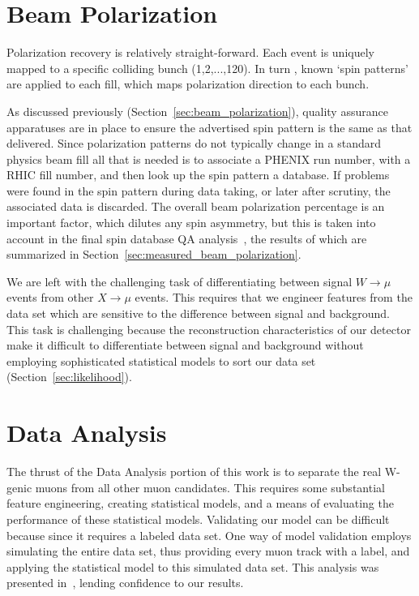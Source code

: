 \section{Beam Polarization}

Polarization recovery is relatively straight-forward. Each event is uniquely
mapped to a specific colliding bunch (1,2,...,120). In turn , known `spin
patterns' are applied to each fill, which maps polarization direction to each
bunch. 

As discussed previously (Section~\ref{sec:beam_polarization}), quality assurance
apparatuses are in place to ensure the advertised spin pattern is the same as
that delivered. Since polarization patterns do not typically change in a
standard physics beam fill all that is needed is to associate a PHENIX run
number, with a RHIC fill number, and then look up the spin pattern a database.
If problems were found in the spin pattern during data taking, or later after
scrutiny, the associated data is discarded. The overall beam polarization
percentage is an important factor, which dilutes any spin asymmetry, but this is
taken into account in the final spin database QA analysis~\cite{Kim2014}, the
results of which are summarized in Section~\ref{sec:measured_beam_polarization}.

We are left with the challenging task of differentiating between signal
$W\rightarrow\mu$ events from other $X\rightarrow\mu$ events. This requires that
we engineer features from the data set which are sensitive to the difference
between signal and background. This task is challenging because the
reconstruction characteristics of our detector make it difficult to
differentiate between signal and background without employing sophisticated
statistical models to sort our data set (Section~\ref{sec:likelihood}).


\section{Data Analysis}

The thrust of the Data Analysis portion of this work is to separate the real
W-genic muons from all other muon candidates. This requires some substantial
feature engineering, creating statistical models, and a means of evaluating the
performance of these statistical models. Validating our model can be difficult
because since it requires a labeled data set. One way of model validation
employs simulating the entire data set, thus providing every muon track with a
label, and applying the statistical model to this simulated data set. This
analysis was presented in~\cite{Seidl2014a}, lending confidence to our results.

